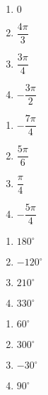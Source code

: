 \begin{multicols}{4}

\begin{enumerate}

\setcounter{enumi}{\value{HW}}

\item $0$ 
\item $\dfrac{4\pi}{3}$
\item $\dfrac{3\pi}{4}$
\item $-\dfrac{3\pi}{2}$

\setcounter{HW}{\value{enumi}}

\end{enumerate}

\end{multicols}

\begin{multicols}{4}

\begin{enumerate}

\setcounter{enumi}{\value{HW}}

\item $-\dfrac{7\pi}{4}$
\item $\dfrac{5\pi}{6}$
\item $\dfrac{\pi}{4}$ 
\item $-\dfrac{5\pi}{4}$

\setcounter{HW}{\value{enumi}}

\end{enumerate}

\end{multicols}

\begin{multicols}{4}

\begin{enumerate}

\setcounter{enumi}{\value{HW}}

\item $180^{\circ}$
\item $-120^{\circ}$
\item $210^{\circ}$
\item $330^{\circ}$

\setcounter{HW}{\value{enumi}}

\end{enumerate}

\end{multicols}

\begin{multicols}{4}

\begin{enumerate}

\setcounter{enumi}{\value{HW}}

\item $60^{\circ}$
\item $300^{\circ}$
\item $-30^{\circ}$
\item $90^{\circ}$

\setcounter{HW}{\value{enumi}}

\end{enumerate}

\end{multicols}

